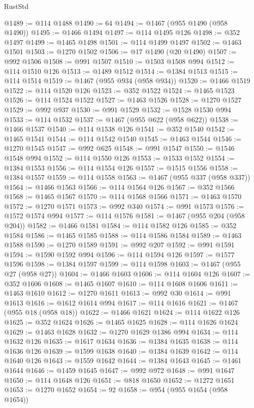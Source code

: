 \begin{lexlean}{RustStd}
\begin{coremodule}
@1489 := @114 @1488
@1490 := 64
@1494 := @1467 (@955 @1490 (@958 @1490))
@1495 := @1466 @1494
@1497 := @114 @1495 @126
@1498 := @352 @1497
@1499 := @1465 @1498
@1501 := @114 @1499 @1497
@1502 := @1463 @1501
@1503 := @1270 @1502
@1506 := @17 @1490 (@20 @1490)
@1507 := @992 @1506
@1508 := @991 @1507
@1510 := @1503 @1508 @994
@1512 := @114 @1510 @126
@1513 := @1489 @1512
@1514 := @1384 @1513
@1515 := @114 @1514
@1519 := @1467 (@955 @934 (@958 @934))
@1520 := @1466 @1519
@1522 := @114 @1520 @126
@1523 := @352 @1522
@1524 := @1465 @1523
@1526 := @114 @1524 @1522
@1527 := @1463 @1526
@1528 := @1270 @1527
@1529 := @992 @937
@1530 := @991 @1529
@1532 := @1528 @1530 @994
@1533 := @114 @1532
@1537 := @1467 (@955 @622 (@958 @622))
@1538 := @1466 @1537
@1540 := @114 @1538 @126
@1541 := @352 @1540
@1542 := @1465 @1541
@1544 := @114 @1542 @1540
@1545 := @1463 @1544
@1546 := @1270 @1545
@1547 := @992 @625
@1548 := @991 @1547
@1550 := @1546 @1548 @994
@1552 := @114 @1550 @126
@1553 := @1533 @1552
@1554 := @1384 @1553
@1556 := @114 @1554 @126
@1557 := @1515 @1556
@1558 := @1384 @1557
@1559 := @114 @1558
@1563 := @1467 (@955 @337 (@958 @337))
@1564 := @1466 @1563
@1566 := @114 @1564 @126
@1567 := @352 @1566
@1568 := @1465 @1567
@1570 := @114 @1568 @1566
@1571 := @1463 @1570
@1572 := @1270 @1571
@1573 := @992 @340
@1574 := @991 @1573
@1576 := @1572 @1574 @994
@1577 := @114 @1576
@1581 := @1467 (@955 @204 (@958 @204))
@1582 := @1466 @1581
@1584 := @114 @1582 @126
@1585 := @352 @1584
@1586 := @1465 @1585
@1588 := @114 @1586 @1584
@1589 := @1463 @1588
@1590 := @1270 @1589
@1591 := @992 @207
@1592 := @991 @1591
@1594 := @1590 @1592 @994
@1596 := @114 @1594 @126
@1597 := @1577 @1596
@1598 := @1384 @1597
@1599 := @114 @1598
@1603 := @1467 (@955 @27 (@958 @27))
@1604 := @1466 @1603
@1606 := @114 @1604 @126
@1607 := @352 @1606
@1608 := @1465 @1607
@1610 := @114 @1608 @1606
@1611 := @1463 @1610
@1612 := @1270 @1611
@1613 := @992 @30
@1614 := @991 @1613
@1616 := @1612 @1614 @994
@1617 := @114 @1616
@1621 := @1467 (@955 @18 (@958 @18))
@1622 := @1466 @1621
@1624 := @114 @1622 @126
@1625 := @352 @1624
@1626 := @1465 @1625
@1628 := @114 @1626 @1624
@1629 := @1463 @1628
@1632 := @1270 @1629 @1386 @994
@1634 := @114 @1632 @126
@1635 := @1617 @1634
@1636 := @1384 @1635
@1638 := @114 @1636 @126
@1639 := @1599 @1638
@1640 := @1384 @1639
@1642 := @114 @1640 @126
@1643 := @1559 @1642
@1644 := @1384 @1643
@1645 := @1461 @1644
@1646 := @1459 @1645
@1647 := @992 @972
@1648 := @991 @1647
@1650 := @114 @1648 @126
@1651 := @818 @1650
@1652 := @1272 @1651
@1653 := @1270 @1652
@1654 := 92
@1658 := @954 (@955 @1654 (@958 @1654))

\end{coremodule}
\end{lexlean}
